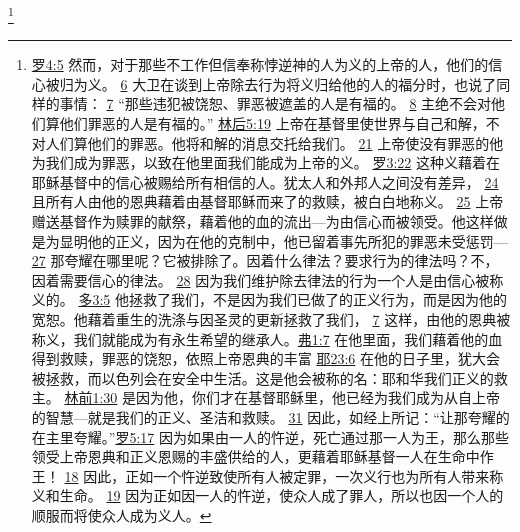 \documentclass[12pt, a4paper, oneside]{ctexart}
\begin{document}
	\footnote {
		\href{https://biblehub.com/romans/4-5.htm}{罗4:5} 然而，对于那些不工作但信奉称悖逆神的人为义的上帝的人，他们的信心被归为义。
		\href{https://biblehub.com/romans/4-6.htm}{6} 大卫在谈到上帝除去行为将义归给他的人的福分时，也说了同样的事情：
		\href{https://biblehub.com/romans/4-7.htm}{7} “那些违犯被饶恕、罪恶被遮盖的人是有福的。
		\href{https://biblehub.com/romans/4-8.htm}{8} 主绝不会对他们算他们罪恶的人是有福的。”
		\href{https://biblehub.com/2_corinthians/5-19.htm}{林后5:19} 上帝在基督里使世界与自己和解，不对人们算他们的罪恶。他将和解的消息交托给我们。
		\href{https://biblehub.com/2_corinthians/5-21.htm}{21} 上帝使没有罪恶的他为我们成为罪恶，以致在他里面我们能成为上帝的义。
		\href{https://biblehub.com/romans/3-22.htm}{罗3:22} 这种义藉着在耶稣基督中的信心被赐给所有相信的人。犹太人和外邦人之间没有差异，
		\href{https://biblehub.com/romans/3-24.htm}{24} 且所有人由他的恩典藉着由基督耶稣而来了的救赎，被白白地称义。
		\href{https://biblehub.com/romans/3-25.htm}{25} 上帝赠送基督作为赎罪的献祭，藉着他的血的流出---为由信心而被领受。他这样做是为显明他的正义，因为在他的克制中，他已留着事先所犯的罪恶未受惩罚---
		\href{https://biblehub.com/romans/3-27.htm}{27} 那夸耀在哪里呢？它被排除了。因着什么律法？要求行为的律法吗？不，因着需要信心的律法。
		\href{https://biblehub.com/romans/3-28.htm}{28} 因为我们维护除去律法的行为一个人是由信心被称义的。
		\href{https://biblehub.com/titus/3-5.htm}{多3:5} 他拯救了我们，不是因为我们已做了的正义行为，而是因为他的宽恕。他藉着重生的洗涤与因圣灵的更新拯救了我们， 
		\href{https://biblehub.com/titus/3-7.htm}{7} 这样，由他的恩典被称义，我们就能成为有永生希望的继承人。\href{https://biblehub.com/ephesians/1-7.htm}{弗1:7} 在他里面，我们藉着他的血得到救赎，罪恶的饶恕，依照上帝恩典的丰富
		\href{https://biblehub.com/jeremiah/23-6.htm}{耶23:6} 在他的日子里，犹大会被拯救，而以色列会在安全中生活。这是他会被称的名：耶和华我们正义的救主。
		\href{https://biblehub.com/1_corinthians/1-30.htm}{林前1:30} 是因为他，你们才在基督耶稣里，他已经为我们成为从自上帝的智慧---就是我们的正义、圣洁和救赎。
		\href{https://biblehub.com/1_corinthians/1-31.htm}{31} 因此，如经上所记：“让那夸耀的在主里夸耀。”\href{https://biblehub.com/romans/5-17.htm}{罗5:17} 因为如果由一人的忤逆，死亡通过那一人为王，那么那些领受上帝恩典和正义恩赐的丰盛供给的人，更藉着耶稣基督一人在生命中作王！
		\href{https://biblehub.com/romans/5-18.htm}{18} 因此，正如一个忤逆致使所有人被定罪，一次义行也为所有人带来称义和生命。
		\href{https://biblehub.com/romans/5-19.htm}{19} 因为正如因一人的忤逆，使众人成了罪人，所以也因一个人的顺服而将使众人成为义人。
	}
\end{document}

